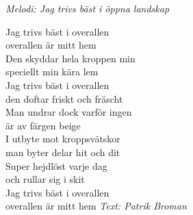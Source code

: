 {\footnotesize\textit{Melodi: Jag trivs bäst i öppna landskap}}\par
\vspace{10pt}
\par
Jag trivs bäst i overallen\\
overallen är mitt hem\\
Den skyddar hela kroppen min\\
speciellt min kära lem\\
Jag trivs bäst i overallen\\
den doftar friskt och fräscht\\
Man undrar dock varför ingen\\
är av färgen beige\\
\vspace{10pt}
I utbyte mot kroppsvätskor\\
man byter delar hit och dit\\
Super hejdlöst varje dag\\
och rullar sig i skit\\
Jag trivs bäst i overallen\\
overallen är mitt hem
\vspace{10pt}
{\footnotesize\textit{Text: Patrik Broman}}
